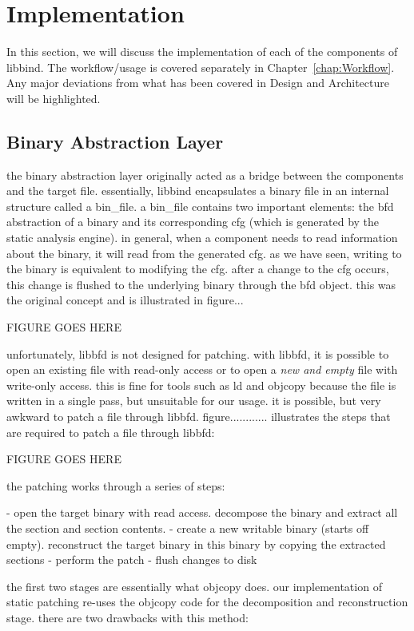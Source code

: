 \chapter{Implementation}\label{chap:Implementation}

In this section, we will discuss the implementation of each of the components of libbind. The workflow/usage is covered separately in Chapter~\ref{chap:Workflow}. Any major deviations from what has been covered in Design and Architecture will be highlighted.

\section{Binary Abstraction Layer}

the binary abstraction layer originally acted as a bridge between the components and the target file. essentially, libbind encapsulates a binary file in an internal structure called a bin\_file. a bin\_file contains two important elements: the bfd abstraction of a binary and its corresponding cfg (which is generated by the static analysis engine). in general, when a component needs to read information about the binary, it will read from the generated cfg. as we have seen, writing to the binary is equivalent to modifying the cfg. after a change to the cfg occurs, this change is flushed to the underlying binary through the bfd object. this was the original concept and is illustrated in figure...

FIGURE GOES HERE

unfortunately, libbfd is not designed for patching. with libbfd, it is possible to open an existing file with read-only access or to open a \emph{new and empty} file with write-only access. this is fine for tools such as ld and objcopy because the file is written in a single pass, but unsuitable for our usage. it is possible, but very awkward to patch a file through libbfd. figure............ illustrates the steps that are required to patch a file through libbfd:

FIGURE GOES HERE

the patching works through a series of steps:

- open the target binary with read access. decompose the binary and extract all the section and section contents.
- create a new writable binary (starts off empty). reconstruct the target binary in this binary by copying the extracted sections
- perform the patch
- flush changes to disk

the first two stages are essentially what objcopy does. our implementation of static patching re-uses the objcopy code for the decomposition and reconstruction stage. there are two drawbacks with this method:

